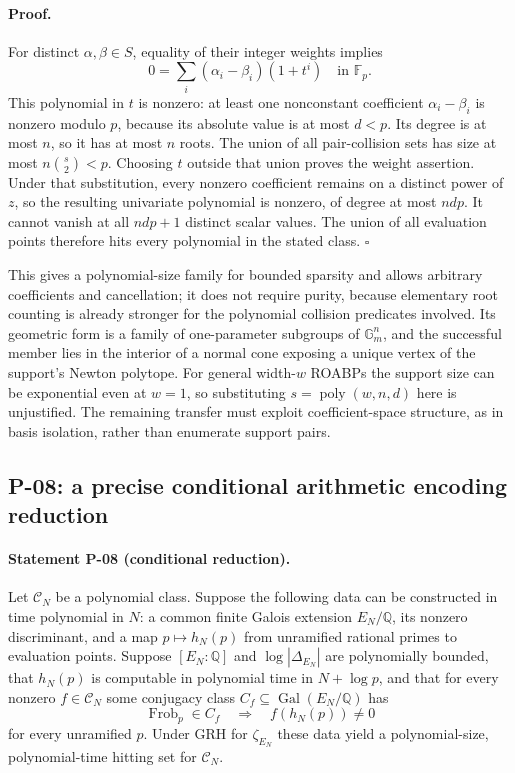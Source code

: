 \documentclass[11pt,a4paper]{article}
\theoremstyle{definition}\newtheorem{definition}{Definition}
\begin{document}
\paragraph{Proof.}
For distinct $\alpha,\beta\in S$, equality of their integer weights implies
\[
 0=\sum_i(\alpha_i-\beta_i)(1+t^i)\quad\text{in }\mathbb F_p.
\]
This polynomial in $t$ is nonzero: at least one nonconstant coefficient $\alpha_i-\beta_i$ is nonzero modulo $p$, because its absolute value is at most $d<p$. Its degree is at most $n$, so it has at most $n$ roots. The union of all pair-collision sets has size at most $n\binom{s}{2}<p$. Choosing $t$ outside that union proves the weight assertion. Under that substitution, every nonzero coefficient remains on a distinct power of $z$, so the resulting univariate polynomial is nonzero, of degree at most $ndp$. It cannot vanish at all $ndp+1$ distinct scalar values. The union of all evaluation points therefore hits every polynomial in the stated class. $\square$

This gives a polynomial-size family for bounded sparsity and allows arbitrary coefficients and cancellation; it does not require purity, because elementary root counting is already stronger for the polynomial collision predicates involved. Its geometric form is a family of one-parameter subgroups of $\mathbb G_m^n$, and the successful member lies in the interior of a normal cone exposing a unique vertex of the support's Newton polytope. For general width-$w$ ROABPs the support size can be exponential even at $w=1$, so substituting $s=\operatorname{poly}(w,n,d)$ here is unjustified. The remaining transfer must exploit coefficient-space structure, as in basis isolation, rather than enumerate support pairs.

\subsection{P-08: a precise conditional arithmetic encoding reduction}
\paragraph{Statement P-08 (conditional reduction).}
Let $\mathcal C_N$ be a polynomial class. Suppose the following data can be constructed in time polynomial in $N$: a common finite Galois extension $E_N/\mathbb Q$, its nonzero discriminant, and a map $p\mapsto h_N(p)$ from unramified rational primes to evaluation points. Suppose $[E_N:\mathbb Q]$ and $\log|\Delta_{E_N}|$ are polynomially bounded, that $h_N(p)$ is computable in polynomial time in $N+\log p$, and that for every nonzero $f\in\mathcal C_N$ some conjugacy class $C_f\subseteq\operatorname{Gal}(E_N/\mathbb Q)$ has
\[
 \operatorname{Frob}_p\in C_f\quad\Longrightarrow\quad f(h_N(p))\ne0
\]
for every unramified $p$. Under GRH for $\zeta_{E_N}$ these data yield a polynomial-size, polynomial-time hitting set for $\mathcal C_N$.
\end{document}
